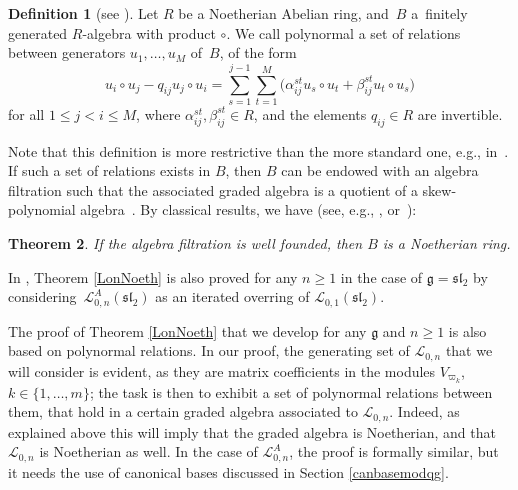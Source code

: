 \documentclass[10pt,a4paper]{amsart}
\numberwithin{equation}{section}
\newtheorem{teo}{Theorem}[section]
\theoremstyle{definition}
\newtheorem{defi}[teo]{Definition}
\newcommand{\Ll}{{\mathcal L}}
\begin{document}
\begin{defi}[{see \cite[Proposition 3.133]{VY}}] Let $R$ be a Noetherian Abelian ring, and~$B$ a~finitely generated $R$-algebra with product $\circ$. We call polynormal a set of relations between generators $u_1,\dots,u_M$ of~$B$, of the form{\samepage
\begin{equation}\label{echangegrad++}
u_i\circ u_j - q_{ij} u_j\circ u_i = \sum_{s=1}^{j-1}\sum_{t=1}^M \bigl(\alpha_{ij}^{st} u_s\circ u_t + \beta_{ij}^{st} u_t\circ u_s\bigr)
\end{equation}
for all $1\leq j<i\leq M$, where $\alpha_{ij}^{st}, \beta_{ij}^{st} \in R$, and the elements $q_{ij}\in R$ are invertible.}
\end{defi}
Note that this definition is more restrictive than the more standard one, e.g., in~\cite[Definition~II.4.1]{BG}. If such a set of relations exists in $B$, then $B$ can be endowed with an algebra filtration such that the associated graded algebra is a quotient of a skew-polynomial algebra~\cite[Proposition I.8.17]{BG}. By classical results, we have (see, e.g., \cite[Theorems~1.2.9, 1.6.9 and Examples~1.6.11]{MC-R}, or~\cite[Lemmas~3.130--3.131]{VY}):

\begin{teo} If the algebra filtration is well founded, then $B$ is a Noetherian ring.
\end{teo}

In \cite{DomLen}, Theorem \ref{LonNoeth} is also proved for any $n\geq 1$ in the case of $\mathfrak{g}={\mathfrak{sl}_2}$ by considering~$\Ll_{0,n}^A({\mathfrak{sl}_2})$ as an iterated overring of ${\mathcal L}_{0,1}({\mathfrak{sl}_2})$.


The proof of Theorem \ref{LonNoeth} that we develop for any $\mathfrak{g}$ and $n\geq 1$ is also based on polynormal relations. In our proof, the generating set of $\Ll_{0,n}$ that we will consider is evident, as they are matrix coefficients in the modules $V_{\varpi_k}$, $k\in\{1,\dots,m\}$; the task is then to exhibit a set of polynormal relations between them, that hold in a certain graded algebra associated to $\Ll_{0,n}$. Indeed, as explained above this will imply that the graded algebra is Noetherian, and that $\Ll_{0,n}$ is Noetherian as well. In the case of $\Ll_{0,n}^A$, the proof is formally similar, but it needs the use of canonical bases discussed in Section \ref{canbasemodqg}.
\end{document}
